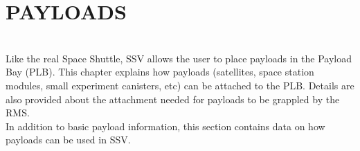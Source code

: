 \documentclass[Space_Shuttle_Vessel_Manual.tex]{subfiles}
\begin{document}
\section{PAYLOADS}
\begin{multicols*}{2}
\label{sec:payloads}
\renewcommand{\cfttoctitlefont}{\bf}
\localtableofcontents
\noindent
\\
Like the real Space Shuttle, SSV allows the user to place payloads in the Payload Bay (PLB). This chapter explains how payloads (satellites, space station modules, small experiment canisters, etc) can be attached to the PLB. Details are also provided about the attachment needed for payloads to be grappled by the RMS.\\
In addition to basic payload information, this section contains data on how payloads can be used in SSV.

\end{multicols*}
\end{document}
